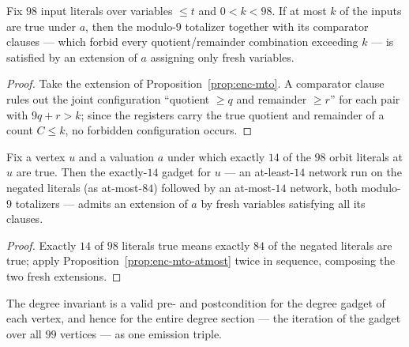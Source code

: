 \begin{proposition}\label{prop:enc-mto-atmost}
Fix $98$ input literals over variables $\leq t$ and $0 < k < 98$.  If at most
$k$ of the inputs are true under $a$, then the modulo-$9$ totalizer together
with its comparator clauses --- which forbid every quotient/remainder
combination exceeding $k$ --- is satisfied by an extension of $a$ assigning
only fresh variables.
\leanok
{}
\end{proposition}

\begin{proof}\leanok
Take the extension of Proposition~\ref{prop:enc-mto}.  A comparator clause
rules out the joint configuration ``quotient $\geq q$ and remainder
$\geq r$'' for each pair with $9q + r > k$; since the registers carry the
true quotient and remainder of a count $C \leq k$, no forbidden
configuration occurs.
\end{proof}

\begin{lemma}\label{lem:enc-deg-gadget}
Fix a vertex $u$ and a valuation $a$ under which exactly $14$ of the $98$
orbit literals at $u$ are true.  Then the exactly-$14$ gadget for $u$ --- an
at-least-$14$ network run on the negated literals (as at-most-$84$) followed
by an at-most-$14$ network, both modulo-$9$ totalizers --- admits an
extension of $a$ by fresh variables satisfying all its clauses.
\leanok
{}
\end{lemma}

\begin{proof}\leanok
Exactly $14$ of $98$ literals true means exactly $84$ of the negated
literals are true; apply Proposition~\ref{prop:enc-mto-atmost} twice in
sequence, composing the two fresh extensions.
\end{proof}

\begin{proposition}\label{prop:enc-deg-section}
The degree invariant is a valid pre- and postcondition for the degree gadget
of each vertex, and hence for the entire degree section --- the iteration of
the gadget over all $99$ vertices --- as one emission triple.
\leanok
{}
\end{proposition}

